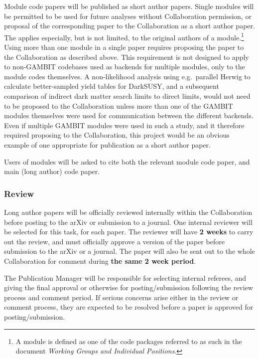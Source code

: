 Module code papers will be published as short author papers.  Single modules will be permitted to be used for future analyses without Collaboration permission, or proposal of the corresponding paper to the Collaboration as a short author paper.  The applies especially, but is not limited, to the original authors of a module.\footnote{A module is defined as one of the code packages referred to as such in the document \textit{Working Groups and Individual Positions}.}  Using more than one module in a single paper requires proposing the paper to the Collaboration as described above.  This requirement is not designed to apply to non-GAMBIT codebases used as backends for multiple modules, only to the module codes themselves.  A non-likelihood analysis using e.g.\ parallel Herwig to calculate better-sampled yield tables for DarkSUSY, and a subsequent comparison of indirect dark matter search limits to direct limits, would not need to be proposed to the Collaboration unless more than one of the GAMBIT modules themselves were used for communication between the different backends.  Even if multiple GAMBIT modules were used in such a study, and it therefore required proposing to the Collaboration, this project would be an obvious example of one appropriate for publication as a short author paper.

Users of modules will be asked to cite both the relevant module code paper, and main (long author) code paper.

\subsubsection{Review}

Long author papers will be officially reviewed internally within the Collaboration before posting to the arXiv or submission to a journal.  One internal reviewer will be selected for this task, for each paper.  The reviewer will have \textbf{2 weeks} to carry out the review, and must officially approve a version of the paper before submission to the arXiv or a journal.  The paper will also be sent out to the whole Collaboration for comment during \textbf{the same 2 week period}.

The Publication Manager will be responsible for selecting internal referees, and giving the final approval or otherwise for posting/submission following the review process and comment period.  If serious concerns arise either in the review or comment process, they are expected to be resolved before a paper is approved for posting/submission.

